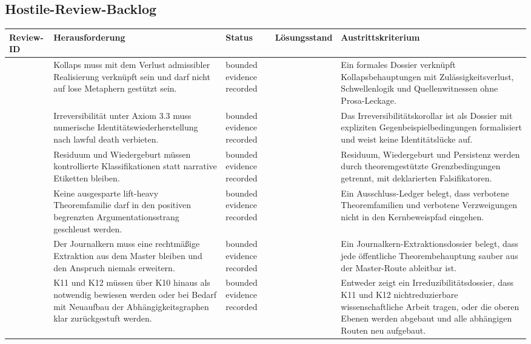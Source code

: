\subsection{Hostile-Review-Backlog}
\begin{center}
\begin{tabular}{@{}L{0.18\textwidth}L{0.25\textwidth}L{0.11\textwidth}L{0.15\textwidth}L{0.23\textwidth}@{}}
\toprule
Review-ID & Herausforderung & Status & Lösungsstand & Austrittskriterium \\
\midrule
{} & Kollaps muss mit dem Verlust admissibler Realisierung verknüpft sein und darf nicht auf lose Metaphern gestützt sein. & bounded evidence recorded &  & Ein formales Dossier verknüpft Kollapsbehauptungen mit Zulässigkeitsverlust, Schwellenlogik und Quellenwitnessen ohne Prosa-Leckage. \\
 & Irreversibilität unter Axiom 3.3 muss numerische Identitätswiederherstellung nach lawful death verbieten. & bounded evidence recorded &  & Das Irreversibilitätskorollar ist als Dossier mit expliziten Gegenbeispielbedingungen formalisiert und weist keine Identitätslücke auf. \\
 & Residuum und Wiedergeburt müssen kontrollierte Klassifikationen statt narrative Etiketten bleiben. & bounded evidence recorded &  & Residuum, Wiedergeburt und Persistenz werden durch theoremgestützte Grenzbedingungen getrennt, mit deklarierten Falsifikatoren. \\
 & Keine ausgesparte lift-heavy Theoremfamilie darf in den positiven begrenzten Argumentationsstrang geschleust werden. & bounded evidence recorded &  & Ein Ausschluss-Ledger belegt, dass verbotene Theoremfamilien und verbotene Verzweigungen nicht in den Kernbeweispfad eingehen. \\
 & Der Journalkern muss eine rechtmäßige Extraktion aus dem Master bleiben und den Anspruch niemals erweitern. & bounded evidence recorded &  & Ein Journalkern-Extraktionsdossier belegt, dass jede öffentliche Theorembehauptung sauber aus der Master-Route ableitbar ist. \\
 & K11 und K12 müssen über K10 hinaus als notwendig bewiesen werden oder bei Bedarf mit Neuaufbau der Abhängigkeitsgraphen klar zurückgestuft werden. & bounded evidence recorded &  & Entweder zeigt ein Irreduzibilitätsdossier, dass K11 und K12 nichtreduzierbare wissenschaftliche Arbeit tragen, oder die oberen Ebenen werden abgebaut und alle abhängigen Routen neu aufgebaut. \\
\bottomrule
\end{tabular}
\end{center}

